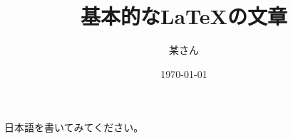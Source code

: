 \documentclass{article}
\author{某さん}
\title{基本的な\LaTeX{}の文章}
\date{\today}
\begin{document}
   \maketitle
   日本語を書いてみてください。
\end{document}
